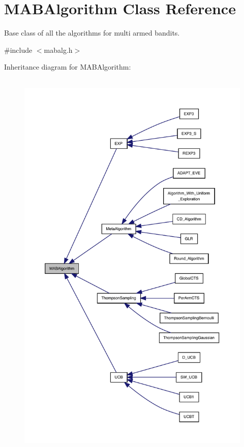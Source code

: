 \hypertarget{class_m_a_b_algorithm}{}\section{M\+A\+B\+Algorithm Class Reference}
\label{class_m_a_b_algorithm}


Base class of all the algorithms for multi armed bandits.  




{\ttfamily \#include $<$mabalg.\+h$>$}



Inheritance diagram for M\+A\+B\+Algorithm\+:
\nopagebreak
\begin{figure}[H]
\begin{center}
\leavevmode
\includegraphics[height=550pt]{class_m_a_b_algorithm__inherit__graph}
\end{center}
\end{figure}
